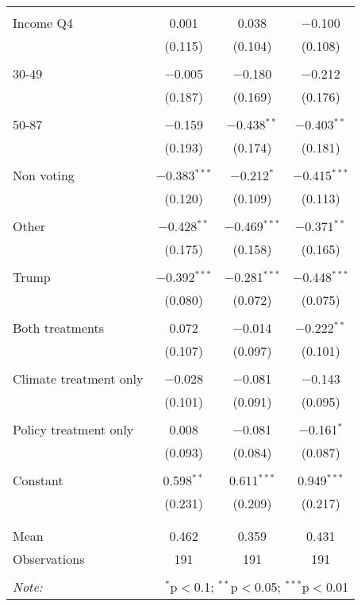 \begin{tabular}{@{\extracolsep{5pt}}lccc}
  & & & \\ 
 Income Q4 & 0.001 & 0.038 & $-$0.100 \\ 
  & (0.115) & (0.104) & (0.108) \\ 
  & & & \\ 
 30-49 & $-$0.005 & $-$0.180 & $-$0.212 \\ 
  & (0.187) & (0.169) & (0.176) \\ 
  & & & \\ 
 50-87 & $-$0.159 & $-$0.438$^{**}$ & $-$0.403$^{**}$ \\ 
  & (0.193) & (0.174) & (0.181) \\ 
  & & & \\ 
 Non voting & $-$0.383$^{***}$ & $-$0.212$^{*}$ & $-$0.415$^{***}$ \\ 
  & (0.120) & (0.109) & (0.113) \\ 
  & & & \\ 
 Other & $-$0.428$^{**}$ & $-$0.469$^{***}$ & $-$0.371$^{**}$ \\ 
  & (0.175) & (0.158) & (0.165) \\ 
  & & & \\ 
 Trump & $-$0.392$^{***}$ & $-$0.281$^{***}$ & $-$0.448$^{***}$ \\ 
  & (0.080) & (0.072) & (0.075) \\ 
  & & & \\ 
 Both treatments & 0.072 & $-$0.014 & $-$0.222$^{**}$ \\ 
  & (0.107) & (0.097) & (0.101) \\ 
  & & & \\ 
 Climate treatment only & $-$0.028 & $-$0.081 & $-$0.143 \\ 
  & (0.101) & (0.091) & (0.095) \\ 
  & & & \\ 
 Policy treatment only & 0.008 & $-$0.081 & $-$0.161$^{*}$ \\ 
  & (0.093) & (0.084) & (0.087) \\ 
  & & & \\ 
 Constant & 0.598$^{**}$ & 0.611$^{***}$ & 0.949$^{***}$ \\ 
  & (0.231) & (0.209) & (0.217) \\ 
  & & & \\ 
\hline \\[-1.8ex] 
Mean & 0.462 & 0.359 & 0.431 \\ 
Observations & 191 & 191 & 191 \\ 
\hline 
\hline \\[-1.8ex] 
\textit{Note:}  & \multicolumn{3}{r}{$^{*}$p$<$0.1; $^{**}$p$<$0.05; $^{***}$p$<$0.01} \\ 
\end{tabular} 
